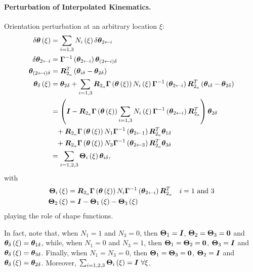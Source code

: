 \paragraph{Perturbation of Interpolated Kinematics.}
Orientation perturbation at an arbitrary location $\xi$:
\begin{align}
	\delta\bm{\theta}\left( \xi \right)
	&=
	\sum_{i=1,3} N_i\left( \xi \right) \delta\bm{\theta}_{2\leftarrow i}
	\\
	\delta\bm{\theta}_{2\leftarrow i}
	&=
	\bm{\Gamma}^{-1}\left( \bm{\theta}_{2\leftarrow i} \right) \bm{\theta}_{(2\leftarrow i) \delta}
	\\
	\bm{\theta}_{(2\leftarrow i) \delta}
	&=
	\bm{R}_{2_a}^T \left( 
		\bm{\theta}_{i\delta}
		- \bm{\theta}_{2\delta}
	 \right)
	\\
	\bm{\theta}_{\delta}\left( \xi \right)
	&=
	\bm{\theta}_{2\delta}
	+ \sum_{i=1,3} \bm{R}_{2_a} \bm{\Gamma}\left( \bm{\theta}\left( \xi \right) \right)
		N_i\left( \xi \right) \bm{\Gamma}^{-1}\left( \bm{\theta}_{2\leftarrow i} \right)
		\bm{R}_{2_a}^T \left( \bm{\theta}_{i\delta} - \bm{\theta}_{2\delta} \right)
	\nonumber \\
	&= \left( 
		\bm{I}
		- \bm{R}_{2_a} \bm{\Gamma}\left( \bm{\theta}\left( \xi \right) \right)
			\sum_{i=1,3} N_i\left( \xi \right) \bm{\Gamma}^{-1}\left( \bm{\theta}_{2\leftarrow i} \right)
			\bm{R}_{2_a}^T
	 \right) \bm{\theta}_{2\delta}
	\nonumber \\
	& \hphantom{= } \mbox{}
	+ \bm{R}_{2_a} \bm{\Gamma}\left( \bm{\theta}\left( \xi \right) \right)
		N_1\bm{\Gamma}^{-1}\left( \bm{\theta}_{2\leftarrow 1} \right)
		\bm{R}_{2_a}^T \bm{\theta}_{1\delta}
	\nonumber \\
	& \hphantom{= } \mbox{}
	+ \bm{R}_{2_a} \bm{\Gamma}\left( \bm{\theta}\left( \xi \right) \right)
		N_3\bm{\Gamma}^{-1}\left( \bm{\theta}_{2\leftarrow 3} \right)
		\bm{R}_{2_a}^T \bm{\theta}_{3\delta}
	\nonumber \\
	&=
	\sum_{i=1,2,3} \bm{\Theta}_i\left( \xi \right) \bm{\theta}_{i\delta}
	,
\end{align}
with
\begin{subequations}
\begin{align}
	\bm{\Theta}_i\left( \xi \right)
	&=
	\bm{R}_{2_a} \bm{\Gamma}\left( \bm{\theta}\left( \xi \right) \right)
		N_i\bm{\Gamma}^{-1}\left( \bm{\theta}_{2\leftarrow i} \right)
		\bm{R}_{2_a}^T
		& i=\text{1 and 3}
	\\
	\bm{\Theta}_2\left( \xi \right)
	&=
	\bm{I} - \bm{\Theta}_1\left( \xi \right) - \bm{\Theta}_3\left( \xi \right)
\end{align}
\end{subequations}
playing the role of shape functions.

In fact, note that, when $N_1=1$ and $N_3=0$, then
$\bm{\Theta}_1=\bm{I}$, $\bm{\Theta}_2=\bm{\Theta}_3=\bm{0}$
and $\bm{\theta}_{\delta}\left( \xi \right)=\bm{\theta}_{1\delta}$,
while, when $N_1=0$ and $N_3=1$, then
$\bm{\Theta}_1=\bm{\Theta}_2=\bm{0}$, $\bm{\Theta}_3=\bm{I}$
and $\bm{\theta}_{\delta}\left( \xi \right)=\bm{\theta}_{3\delta}$.
Finally, when $N_1=N_3=0$, then
$\bm{\Theta}_1=\bm{\Theta}_3=\bm{0}$, $\bm{\Theta}_2=\bm{I}$
and $\bm{\theta}_{\delta}\left( \xi \right)=\bm{\theta}_{2\delta}$.
Moreover, $\sum_{i=1,2,3}\TT{\Theta}_i\plbr{\xi}=\TT{I} \ \forall\xi$.

